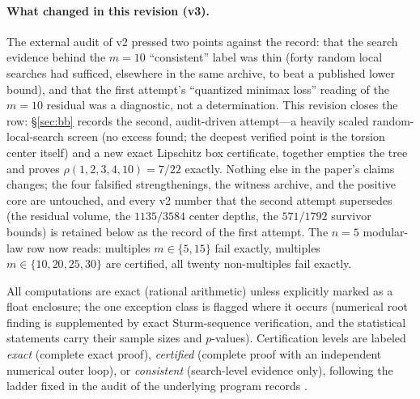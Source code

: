 \paragraph{What changed in this revision (v3).}
The external audit of v2 pressed two points against the record: that
the search evidence behind the $m=10$ ``consistent'' label was thin
(forty random local searches had sufficed, elsewhere in the same
archive, to beat a published lower bound), and that the first
attempt's ``quantized minimax loss'' reading of the $m=10$ residual
was a diagnostic, not a determination. This revision closes the row:
\S\ref{sec:bb} records the second, audit-driven attempt---a heavily
scaled random-local-search screen (no excess found; the deepest
verified point is the torsion center itself) and a new exact Lipschitz
box certificate, together empties the tree and proves
$\rho(1,2,3,4,10)=7/22$ exactly. Nothing else in the paper's claims
changes; the four falsified strengthenings, the witness archive, and
the positive core are untouched, and every v2 number that the second
attempt supersedes (the residual volume, the $1135/3584$ center
depths, the $571/1792$ survivor bounds) is retained below as the
record of the first attempt. The $n=5$ modular-law row now reads:
multiples $m\in\{5,15\}$ fail exactly, multiples
$m\in\{10,20,25,30\}$ are certified, all twenty non-multiples fail
exactly.

All computations are exact (rational arithmetic) unless explicitly marked
as a float enclosure; the one exception class is flagged where it occurs
(numerical root finding is supplemented by exact Sturm-sequence
verification, and the statistical statements carry their sample sizes and
$p$-values). Certification levels are labeled \emph{exact}
(complete exact proof), \emph{certified} (complete proof with an
independent numerical outer loop), or \emph{consistent} (search-level
evidence only), following the ladder fixed in the audit of the underlying
program records \cite{prog-artifacts}.

